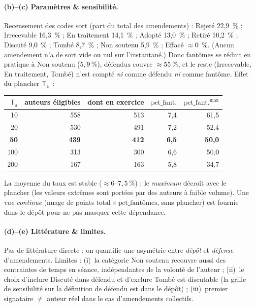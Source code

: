 \documentclass[11pt,a4paper]{article}
\newcommand{\param}[1]{\ensuremath{\mathsf{#1}}}
\begin{document}
\paragraph{(b)--(c) Paramètres \& sensibilité.} Recensement des codes \og{}sort\fg{}
(part du total des amendements) : Rejeté 22,9~\% ; Irrecevable 16,3~\% ; En
traitement 14,1~\% ; Adopté 13,0~\% ; Retiré 10,2~\% ; Discuté 9,0~\% ; Tombé
8,7~\% ; Non soutenu 5,9~\% ; Effacé $\approx$0~\%. (Aucun amendement n'a de sort
vide ou nul sur l'instantané.) Donc $\text{fantômes}$ se réduit en pratique à
\og{}Non soutenu\fg{} ($5{,}9~\%$), $\text{défendus}$ couvre $\approx 55~\%$,
et le reste (Irrecevable, En traitement, Tombé) n'est compté \emph{ni} comme
défendu \emph{ni} comme fantôme. Effet du plancher $\param{T_a}$~:
\begin{center}\small
\begin{tabular}{rrrrr}
\toprule
$\param{T_a}$ & auteurs éligibles & dont en exercice & $\overline{\mathrm{pct\_fant.}}$ & $\mathrm{pct\_fant.}^{\max}$ \\
\midrule
10  & 558 & 513 & 7,4 & 61,5 \\
20  & 530 & 491 & 7,2 & 52,4 \\
\textbf{50}  & \textbf{439} & \textbf{412} & \textbf{6,5} & \textbf{50,0} \\
100 & 313 & 300 & 6,6 & 50,0 \\
200 & 167 & 163 & 5,8 & 34,7 \\
\bottomrule
\end{tabular}
\end{center}
La moyenne du taux est stable ($\approx 6$--$7{,}5~\%$) ; le \emph{maximum} décroît
avec le plancher (les valeurs extrêmes sont portées par des auteurs à faible
volume). Une \emph{vue continue} (nuage de points $\mathrm{total}\times\text{pct\_fantômes}$,
sans plancher) est fournie dans le dépôt pour ne pas masquer cette dépendance.

\paragraph{(d)--(e) Littérature \& limites.} Pas de littérature directe ; on
quantifie une asymétrie entre \emph{dépôt} et \emph{défense} d'amendements.
Limites : (i)~la catégorie \og{}Non soutenu\fg{} recouvre aussi des contraintes de
temps en séance, indépendantes de la volonté de l'auteur ; (ii)~le choix d'inclure
\og{}Discuté\fg{} dans \og{}défendu\fg{} et d'exclure \og{}Tombé\fg{} est
discutable (la grille de sensibilité sur la définition de \og{}défendu\fg{} est dans
le dépôt) ; (iii)~\og{}premier signataire\fg{} $\ne$ \og{}auteur réel\fg{} dans le
cas d'amendements collectifs.
\end{document}
